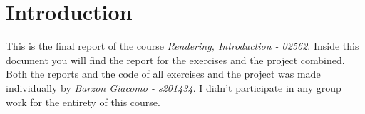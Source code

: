 \section*{Introduction}
This is the final report of the course \textit{Rendering, Introduction - 02562}. Inside this document you will find the report for the exercises and the project combined.\\
Both the reports and the code of all exercises and the project was made individually by \textit{Barzon Giacomo - s201434}. I didn't participate in any group work for the entirety of this course.